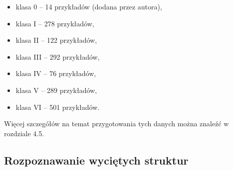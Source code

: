 \begin{itemize}[label=\textbullet]
	\item klasa 0 – 14 przykładów (dodana przez autora),
	\item klasa I – 278 przykładów,
	\item klasa II – 122 przykładów,
	\item klasa III – 292 przykładów,
	\item klasa IV – 76 przykładów,
	\item klasa V – 289 przykładów,
	\item klasa VI – 501 przykładów.
\end{itemize}
Więcej szczegółów na temat przygotowania tych danych można znaleźć w rozdziale 4.5.

\subsection{Rozpoznawanie wyciętych struktur}
\label{klasyfikacja.struktur}

%
%
%
%
%
%
%
